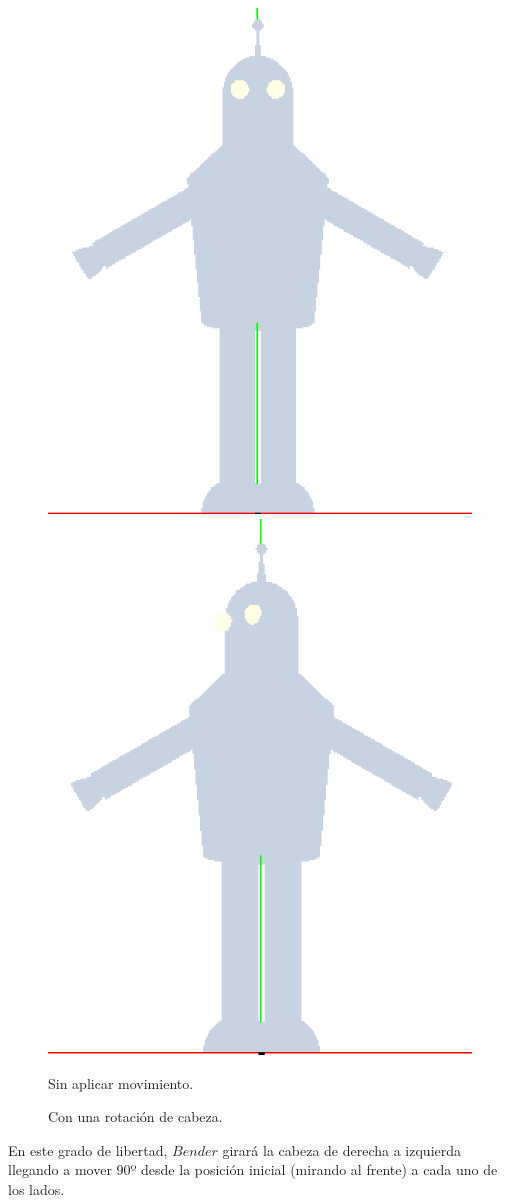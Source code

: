 \documentclass{article}
\begin{document}
	\begin{figure}[h]
		\includegraphics[width=0.4\linewidth]{cabeza1}
		\includegraphics[width=0.38\linewidth]{cabeza2}
		\caption{Sin aplicar movimiento.}
		\caption{Con una rotación de cabeza.}
		\label{fig:cabeza}
	\end{figure}
	
	
	En este grado de libertad, $Bender$ girará la cabeza de derecha a izquierda llegando a mover 90º desde la posición inicial (mirando al frente) a cada uno de los lados.
	
\end{document}
